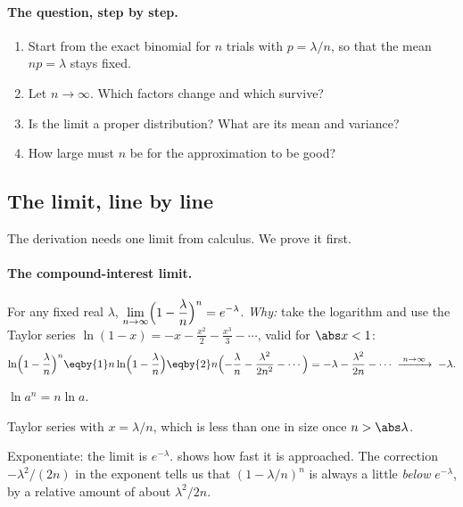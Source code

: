 \paragraph{The question, step by step.}
\begin{enumerate}[leftmargin=1.6em,itemsep=1pt]
  \item Start from the exact binomial for $n$ trials with $p=\lambda/n$, so that the mean $np=\lambda$ stays fixed.
  \item Let $n\to\infty$. Which factors change and which survive?
  \item Is the limit a proper distribution? What are its mean and variance?
  \item How large must $n$ be for the approximation to be good?
\end{enumerate}

\subsection{The limit, line by line}

The derivation needs one limit from calculus. We prove it first.

\paragraph{The compound-interest limit.} For any fixed real $\lambda$, $\displaystyle\lim_{n\to\infty}\Bigl(1-\frac\lambda n\Bigr)^n=e^{-\lambda}$.
\emph{Why:} take the logarithm and use the Taylor series $\ln(1-x)=-x-\tfrac{x^2}2-\tfrac{x^3}3-\cdots$, valid for $\abs x<1$:
\begin{align*}
  \ln\Bigl(1-\frac\lambda n\Bigr)^n
  \eqby{1} n\ln\Bigl(1-\frac\lambda n\Bigr)
  \eqby{2} n\Bigl(-\frac\lambda n-\frac{\lambda^2}{2n^2}-\cdots\Bigr)
  = -\lambda-\frac{\lambda^2}{2n}-\cdots
  \;\xrightarrow{\;n\to\infty\;}\; -\lambda .
\end{align*}
\begin{explain}
  \item $\ln a^n=n\ln a$.
  \item Taylor series with $x=\lambda/n$, which is less than one in size once $n>\abs\lambda$.
\end{explain}
Exponentiate: the limit is $e^{-\lambda}$.  shows how fast it is approached. The correction $-\lambda^2/(2n)$ in the exponent tells us that $(1-\lambda/n)^n$ is always a little \emph{below} $e^{-\lambda}$, by a relative amount of about $\lambda^2/2n$.

